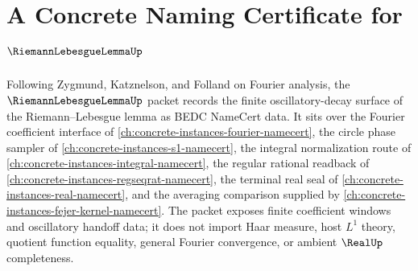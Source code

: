 \chapter{A Concrete Naming Certificate for $\RiemannLebesgueLemmaUp$}
\label{ch:concrete-instances-riemann-lebesgue-lemma-namecert}

Following Zygmund, Katznelson, and Folland on Fourier analysis, the $\RiemannLebesgueLemmaUp$ packet records the finite oscillatory-decay surface of the Riemann--Lebesgue lemma as BEDC NameCert data. It sits over the Fourier coefficient interface of \autoref{ch:concrete-instances-fourier-namecert}, the circle phase sampler of \autoref{ch:concrete-instances-s1-namecert}, the integral normalization route of \autoref{ch:concrete-instances-integral-namecert}, the regular rational readback of \autoref{ch:concrete-instances-regseqrat-namecert}, the terminal real seal of \autoref{ch:concrete-instances-real-namecert}, and the averaging comparison supplied by \autoref{ch:concrete-instances-fejer-kernel-namecert}. The packet exposes finite coefficient windows and oscillatory handoff data; it does not import Haar measure, host $L^{1}$ theory, quotient function equality, general Fourier convergence, or ambient $\RealUp$ completeness.

